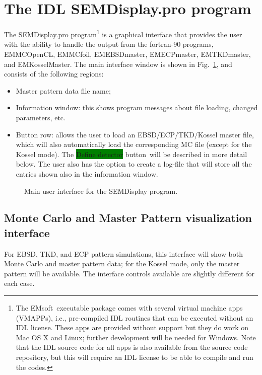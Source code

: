 \documentclass[DIV=calc, paper=letter, fontsize=11pt]{scrartcl}	 %
\newcommand{\ctp}{\textsf{EMsoft}}
\newcommand{\button}[1]{\colorbox{green}{\textsf{#1}} button}
\begin{document}
\section{The IDL \protect\textsf{SEMDisplay.pro} program\label{sec:idl}}
The \textsf{SEMDisplay.pro} program\footnote{The \ctp\ executable package comes with several virtual machine apps (VMAPPs), 
i.e., pre-compiled IDL routines that can be executed without an IDL license.  These apps are provided without support but they do work 
on Mac OS X and Linux; further development will be needed for Windows.  Note that the IDL source code for all apps is also available from
the source code repository, but this will require an IDL license to be able to compile and run the codes.} is a graphical interface that provides the user with the ability to handle the 
output from the fortran-90 programs, \textsf{EMMCOpenCL}, \textsf{EMMCfoil}, \textsf{EMEBSDmaster}, \textsf{EMECPmaster}, \textsf{EMTKDmaster}, and \textsf{EMKosselMaster}.  The main
interface window is shown in Fig.~\ref{fig:EBSDmain}, and consists of the following regions:
\begin{itemize}
	\item Master pattern data file name;
	\item Information window: this shows program messages about file loading, changed parameters, etc.
	\item Button row: allows the user to load an EBSD/ECP/TKD/Kossel master file, which will also automatically load the 
	corresponding MC file (except for the Kossel mode).  The \button{Define detector}\ will be described in more detail below.  The user also has the option to 
	create a log-file that will store all the entries shown also in the information window.
\end{itemize}

\begin{figure}[t]
\leavevmode\centering
\epsfxsize=3in
\caption{\label{fig:EBSDmain}Main user interface for the SEMDisplay program.}
\end{figure}

\subsection{Monte Carlo and Master Pattern visualization interface\label{sec:idlMC}}

For EBSD, TKD, and ECP pattern simulations, this interface will show both Monte Carlo and master pattern data; for the Kossel mode, only the 
master pattern will be available.  The interface controls available are slightly different for each case.
\end{document}
